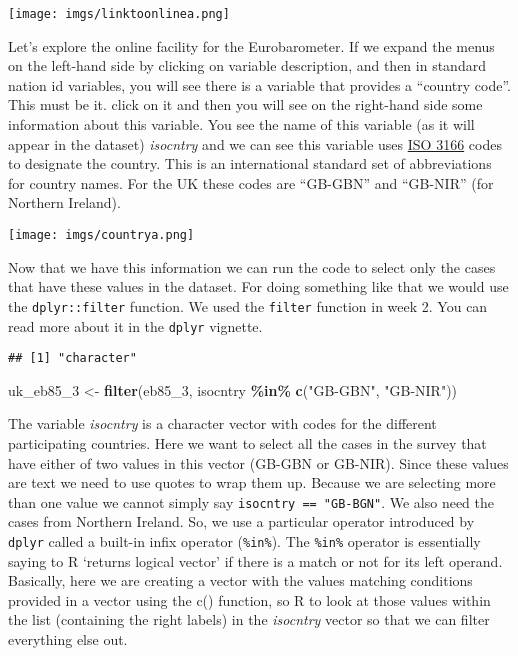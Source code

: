 \documentclass[
]{book}
\newenvironment{Shaded}{\begin{snugshade}}{\end{snugshade}}
\newcommand{\CommentTok}[1]{\textcolor[rgb]{0.56,0.35,0.01}{\textit{#1}}}
\newcommand{\FunctionTok}[1]{\textcolor[rgb]{0.13,0.29,0.53}{\textbf{#1}}}
\newcommand{\NormalTok}[1]{#1}
\newcommand{\OtherTok}[1]{\textcolor[rgb]{0.56,0.35,0.01}{#1}}
\newcommand{\SpecialCharTok}[1]{\textcolor[rgb]{0.81,0.36,0.00}{\textbf{#1}}}
\newcommand{\StringTok}[1]{\textcolor[rgb]{0.31,0.60,0.02}{#1}}
\begin{document}
\texttt{[image: imgs/linktoonlinea.png]}

Let's explore the online facility for the Eurobarometer. If we expand the menus on the left-hand side by clicking on variable description, and then in standard nation id variables, you will see there is a variable that provides a ``country code''. This must be it. click on it and then you will see on the right-hand side some information about this variable. You see the name of this variable (as it will appear in the dataset) \emph{isocntry} and we can see this variable uses \href{https://en.wikipedia.org/wiki/ISO_3166}{ISO 3166} codes to designate the country. This is an international standard set of abbreviations for country names. For the UK these codes are ``GB-GBN'' and ``GB-NIR'' (for Northern Ireland).

\texttt{[image: imgs/countrya.png]}

Now that we have this information we can run the code to select only the cases that have these values in the dataset. For doing something like that we would use the \texttt{dplyr::filter} function. We used the \texttt{filter} function in week 2. You can read more about it in the \texttt{dplyr} vignette.

\begin{Shaded}
\end{Shaded}

\begin{verbatim}
## [1] "character"
\end{verbatim}

\begin{Shaded}
\begin{Highlighting}[]
\NormalTok{uk\_eb85\_3 }\OtherTok{\textless{}{-}} \FunctionTok{filter}\NormalTok{(eb85\_3, isocntry }\SpecialCharTok{\%in\%} \FunctionTok{c}\NormalTok{(}\StringTok{"GB{-}GBN"}\NormalTok{, }\StringTok{"GB{-}NIR"}\NormalTok{))}
\end{Highlighting}
\end{Shaded}

The variable \emph{isocntry} is a character vector with codes for the different participating countries. Here we want to select all the cases in the survey that have either of two values in this vector (GB-GBN or GB-NIR). Since these values are text we need to use quotes to wrap them up. Because we are selecting more than one value we cannot simply say \texttt{isocntry\ ==\ "GB-BGN"}. We also need the cases from Northern Ireland. So, we use a particular operator introduced by \texttt{dplyr} called a built-in infix operator (\texttt{\%in\%}). The \texttt{\%in\%} operator is essentially saying to R `returns logical vector' if there is a match or not for its left operand. Basically, here we are creating a vector with the values matching conditions provided in a vector using the c() function, so R to look at those values within the list (containing the right labels) in the \emph{isocntry} vector so that we can filter everything else out.
\end{document}
